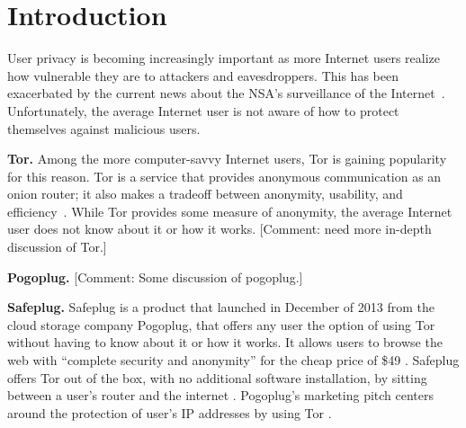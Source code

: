 \section{Introduction}
\label{sec:intro}

User privacy is becoming increasingly important as more Internet users realize how vulnerable they are to attackers and eavesdroppers.  This has been exacerbated by the current news about the NSA's surveillance of the Internet~\cite{nsa}.  Unfortunately, the average Internet user is not aware of how to protect themselves against malicious users.     

{\bf Tor.} Among the more computer-savvy Internet users, Tor is gaining popularity for this reason.  Tor is a service that provides anonymous communication as an onion router; it also makes a tradeoff between anonymity, usability, and efficiency~\cite{tor}.  While Tor provides some measure of anonymity, the average Internet user does not know about it or how it works.  [Comment: need more in-depth discussion of Tor.]

{\bf Pogoplug.} [Comment: Some discussion of pogoplug.]

{\bf Safeplug.} Safeplug is a product that launched in December of 2013 from the cloud storage company Pogoplug, that offers any user the option of using Tor without having to know about it or how it works.  It allows users to browse the web with “complete security and anonymity” for the cheap price of \$49 \cite{safeplug}.  Safeplug offers Tor out of the box, with no additional software installation, by sitting between a user’s router and the internet \cite{wired}.  Pogoplug’s marketing pitch centers around the protection of user’s IP addresses by using Tor \cite{safeplug,bittech}.
